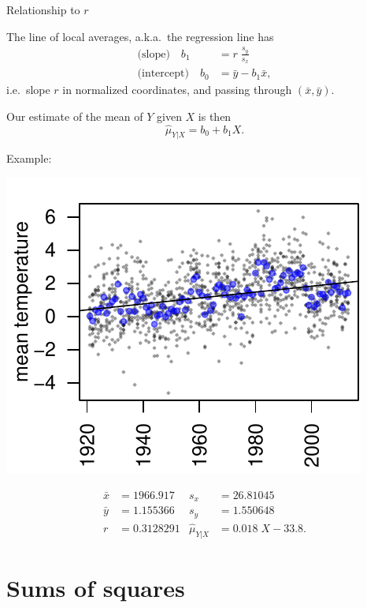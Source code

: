 \begin{frame}{Relationship to $r$}

    The line of local averages,
    a.k.a.\ the \alert{regression line}
    has 
    \begin{align*}
        \text{(slope)}\quad b_1 &= r \; \frac{s_y}{s_x} \\
        \text{(intercept)}\quad b_0 &= \bar y - b_1 \bar x,
    \end{align*}
    i.e.\ slope $r$ in normalized coordinates,
    and passing through $(\bar x, \bar y)$.

    \vspace{2em}

    Our estimate of the mean of $Y$ given $X$ is then
    \[
        \hat \mu_{Y|X} = b_0 + b_1 X .
    \]

\end{frame}

\begin{frame}{Example:}

    \centering
        \includegraphics{usc-temps-regression}

    \begin{align*}
        \bar x &= 1966.917 & s_x &= 26.81045 \\
        \bar y &= 1.155366 & s_y &= 1.550648 \\
               r &= 0.3128291 & \hat \mu_{Y|X} &= 0.018 \; X - 33.8 .
    \end{align*}

\end{frame}

\section{Sums of squares}

